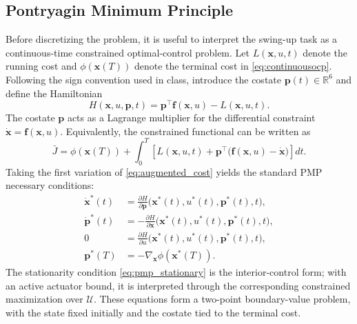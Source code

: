 \documentclass[conference]{IEEEtran}
\begin{document}
\subsection{Pontryagin Minimum Principle}
Before discretizing the problem, it is useful to interpret the swing-up task as a continuous-time constrained optimal-control problem. Let $L(\bm{x},u,t)$ denote the running cost and $\phi(\bm{x}(T))$ denote the terminal cost in \eqref{eq:continuousocp}. Following the sign convention used in class, introduce the costate $\bm{p}(t)\in\mathbb{R}^6$ and define the Hamiltonian
\begin{equation}
H(\bm{x},u,\bm{p},t)
=
\bm{p}^{\top}\bm{f}(\bm{x},u)-L(\bm{x},u,t).
\label{eq:hamiltonian}
\end{equation}
The costate $\bm{p}$ acts as a Lagrange multiplier for the differential constraint $\dot{\bm{x}}=\bm{f}(\bm{x},u)$. Equivalently, the constrained functional can be written as
\begin{equation}
\bar{J}
=
\phi(\bm{x}(T))
+
\int_0^T
\left[
L(\bm{x},u,t)
+
\bm{p}^{\top}\big(\bm{f}(\bm{x},u)-\dot{\bm{x}}\big)
\right]dt.
\label{eq:augmented_cost}
\end{equation}
Taking the first variation of \eqref{eq:augmented_cost} yields the standard PMP necessary conditions:
\begin{align}
\dot{\bm{x}}^*(t)
&= \frac{\partial H}{\partial \bm{p}}
\big(\bm{x}^*(t),u^*(t), \bm{p}^*(t),t\big),
\label{eq:pmp_state}
\\
\dot{\bm{p}}^*(t)
&= -\frac{\partial H}{\partial \bm{x}}
\big(\bm{x}^*(t),u^*(t), \bm{p}^*(t),t\big),
\label{eq:pmp_costate}
\\
0
&= \frac{\partial H}{\partial u}
\big(\bm{x}^*(t),u^*(t),
\bm{p}^*(t),t\big),
\label{eq:pmp_stationary}
\\
\bm{p}^*(T)
&= -\nabla_{\bm{x}}\phi(\bm{x}^*(T)).
\label{eq:pmp_terminal}
\end{align}
The stationarity condition \eqref{eq:pmp_stationary} is the interior-control form; with an active actuator bound, it is interpreted through the corresponding constrained maximization over $\mathcal{U}$. These equations form a two-point boundary-value problem, with the state fixed initially and the costate tied to the terminal cost.
\end{document}
